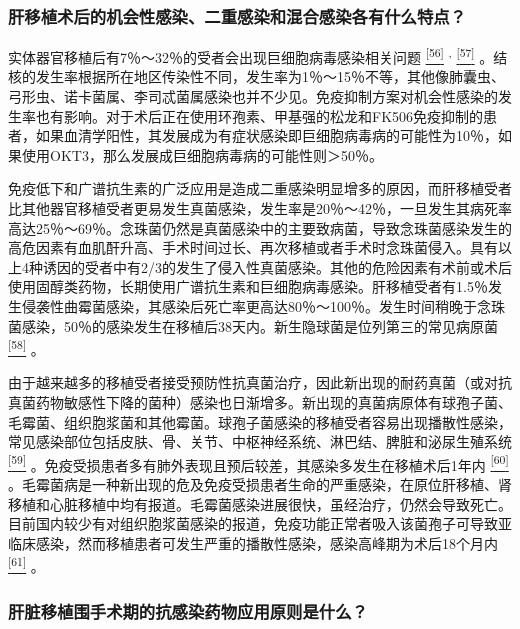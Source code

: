 \subsubsection{肝移植术后的机会性感染、二重感染和混合感染各有什么特点？}

实体器官移植后有7％～32％的受者会出现巨细胞病毒感染相关问题
\protect\hyperlink{text00020.htmlux5cux23ch56-19}{\textsuperscript{{[}56{]}}}
\textsuperscript{,}
\protect\hyperlink{text00020.htmlux5cux23ch57-19}{\textsuperscript{{[}57{]}}}
。结核的发生率根据所在地区传染性不同，发生率为1％～15％不等，其他像肺囊虫、弓形虫、诺卡菌属、李司忒菌属感染也并不少见。免疫抑制方案对机会性感染的发生率也有影响。对于术后正在使用环孢素、甲基强的松龙和FK506免疫抑制的患者，如果血清学阳性，其发展成为有症状感染即巨细胞病毒病的可能性为10％，如果使用OKT3，那么发展成巨细胞病毒病的可能性则＞50％。

免疫低下和广谱抗生素的广泛应用是造成二重感染明显增多的原因，而肝移植受者比其他器官移植受者更易发生真菌感染，发生率是20％～42％，一旦发生其病死率高达25％～69％。念珠菌仍然是真菌感染中的主要致病菌，导致念珠菌感染发生的高危因素有血肌酐升高、手术时间过长、再次移植或者手术时念珠菌侵入。具有以上4种诱因的受者中有2/3的发生了侵入性真菌感染。其他的危险因素有术前或术后使用固醇类药物，长期使用广谱抗生素和巨细胞病毒感染。肝移植受者有1.5％发生侵袭性曲霉菌感染，其感染后死亡率更高达80％～100％。发生时间稍晚于念珠菌感染，50％的感染发生在移植后38天内。新生隐球菌是位列第三的常见病原菌
\protect\hyperlink{text00020.htmlux5cux23ch58-19}{\textsuperscript{{[}58{]}}}
。

由于越来越多的移植受者接受预防性抗真菌治疗，因此新出现的耐药真菌（或对抗真菌药物敏感性下降的菌种）感染也日渐增多。新出现的真菌病原体有球孢子菌、毛霉菌、组织胞浆菌和其他霉菌。球孢子菌感染的移植受者容易出现播散性感染，常见感染部位包括皮肤、骨、关节、中枢神经系统、淋巴结、脾脏和泌尿生殖系统
\protect\hyperlink{text00020.htmlux5cux23ch59-19}{\textsuperscript{{[}59{]}}}
。免疫受损患者多有肺外表现且预后较差，其感染多发生在移植术后1年内
\protect\hyperlink{text00020.htmlux5cux23ch60-19}{\textsuperscript{{[}60{]}}}
。毛霉菌病是一种新出现的危及免疫受损患者生命的严重感染，在原位肝移植、肾移植和心脏移植中均有报道。毛霉菌感染进展很快，虽经治疗，仍然会导致死亡。目前国内较少有对组织胞浆菌感染的报道，免疫功能正常者吸入该菌孢子可导致亚临床感染，然而移植患者可发生严重的播散性感染，感染高峰期为术后18个月内
\protect\hyperlink{text00020.htmlux5cux23ch61-19}{\textsuperscript{{[}61{]}}}
。

\subsubsection{肝脏移植围手术期的抗感染药物应用原则是什么？}

